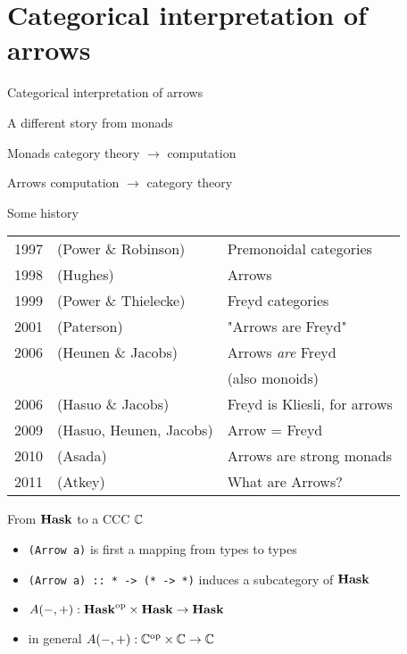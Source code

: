 \section{Categorical interpretation of arrows}

\begin{frame}
    \begin{center}\Huge Categorical interpretation of arrows\end{center}
\end{frame}

\begin{frame}
\begin{center}\Large A different story from monads \end{center}
    \begin{itemeyez}
        \item[Monads] category theory $\to$ computation
        \item[ ]
        \item[Arrows] computation $\to$ category theory
    \end{itemeyez}
\end{frame}

\begin{frame}
\begin{center}\Large Some history\end{center}
    \begin{tabular}{rll}
        1997 & (Power \& Robinson) & Premonoidal categories \\
        1998 & (Hughes)  & Arrows \\
        1999 & (Power \& Thielecke) & Freyd categories \\
        2001 & (Paterson) & "Arrows are Freyd" \\
        2006 & (Heunen \& Jacobs) & Arrows \emph{are} Freyd\\
                                & & (also monoids) \\
        2006 & (Hasuo \& Jacobs) & Freyd is Kliesli, for arrows \\
        2009 & (Hasuo, Heunen, Jacobs) & Arrow = Freyd \\
        2010 & (Asada) & Arrows are strong monads\\
        2011 & (Atkey) & What are Arrows?
    \end{tabular}
\end{frame}

\begin{frame}[fragile]
\begin{center}\Large From $\mathbf{Hask}$ to a CCC $\mathbb{C}$\end{center}
    \begin{itemize}
        \item \verb|(Arrow a)| is first a mapping from types to types
        \item \verb|(Arrow a) :: * -> (* -> *)| induces a subcategory of $\mathbf{Hask}$
        \item $A(-, +): {\mathbf{Hask}}^{\text{op}} \times \mathbf{Hask} \to \mathbf{Hask}$
        \item in general $A(-, +): {\mathbb{C}}^{\text{op}} \times \mathbb{C} \to \mathbb{C}$
    \end{itemize}
\end{frame}

